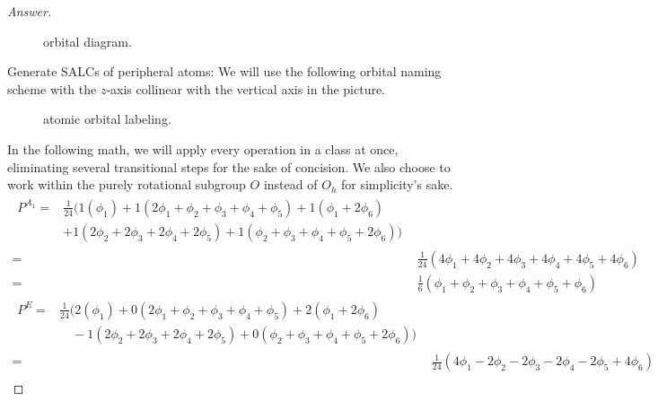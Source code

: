 \documentclass[../psets.tex]{subfiles}
\begin{document}
\begin{enumerate}[label={\Roman*)}]
\begin{enumerate}[label={\alph*)}]
\begin{proof}[Answer]
\begin{figure}[H]
                \caption{ orbital diagram.}
                \label{fig:orbitalDiagram-SF6}
            \end{figure}
            Generate SALCs of peripheral atoms: We will use the following orbital naming scheme with the $z$-axis collinear with the vertical axis in the picture.
            \begin{figure}[h!]
                \centering
                \caption{ atomic orbital labeling.}
                \label{fig:AOs-SF6}
            \end{figure}
            In the following math, we will apply every operation in a class at once, eliminating several transitional steps for the sake of concision. We also choose to work within the purely rotational subgroup $O$ instead of $O_h$ for simplicity's sake.
            \begin{align*}
                \begin{split}
                    P^{A_1} ={}& \frac{1}{24}(1(\phi_1)+1(2\phi_1+\phi_2+\phi_3+\phi_4+\phi_5)+1(\phi_1+2\phi_6)\\
                    & +1(2\phi_2+2\phi_3+2\phi_4+2\phi_5)+1(\phi_2+\phi_3+\phi_4+\phi_5+2\phi_6))
                \end{split}\\
                ={}& \frac{1}{24}(4\phi_1+4\phi_2+4\phi_3+4\phi_4+4\phi_5+4\phi_6)\\
                ={}& \frac{1}{6}(\phi_1+\phi_2+\phi_3+\phi_4+\phi_5+\phi_6)
            \end{align*}
            \begin{align*}
                \begin{split}
                    P^{E} ={}& \frac{1}{24}(2(\phi_1)+0(2\phi_1+\phi_2+\phi_3+\phi_4+\phi_5)+2(\phi_1+2\phi_6)\\
                    &\quad -1(2\phi_2+2\phi_3+2\phi_4+2\phi_5)+0(\phi_2+\phi_3+\phi_4+\phi_5+2\phi_6))
                \end{split}\\
                ={}& \frac{1}{24}(4\phi_1-2\phi_2-2\phi_3-2\phi_4-2\phi_5+4\phi_6)\\

\end{align*}
\end{proof}
\end{enumerate}
\end{enumerate}
\end{document}
